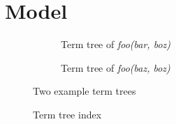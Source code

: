 \section{Model}


\begin{figure}
\centering
\begin{subfigure}{.5\textwidth}
	\centering
	
	\caption{Term tree of \textit{foo(bar, boz)}}
	\label{fig:termTree1}
\end{subfigure}%
\begin{subfigure}{.5\textwidth}
	\centering
	
	\caption{Term tree of \textit{foo(baz, boz)}}
	\label{fig:termTree2}
\end{subfigure}
\caption{Two example term trees}
\label{fig:termTrees}
\end{figure}

\begin{figure}
\begin{center}
	
	\end{center}
	\caption{Term tree index}
	\label{fig:termTreeIndex}
\end{figure}